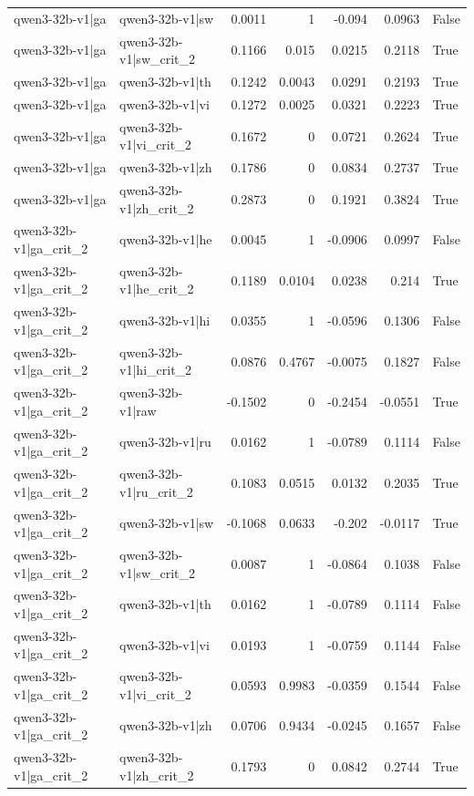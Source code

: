 \begin{table}
\begin{tabular}{l l r r r r l}
qwen3-32b-v1|ga & qwen3-32b-v1|sw & 0.0011 & 1 & -0.094 & 0.0963 & False \\
qwen3-32b-v1|ga & qwen3-32b-v1|sw_crit_2 & 0.1166 & 0.015 & 0.0215 & 0.2118 & True \\
qwen3-32b-v1|ga & qwen3-32b-v1|th & 0.1242 & 0.0043 & 0.0291 & 0.2193 & True \\
qwen3-32b-v1|ga & qwen3-32b-v1|vi & 0.1272 & 0.0025 & 0.0321 & 0.2223 & True \\
qwen3-32b-v1|ga & qwen3-32b-v1|vi_crit_2 & 0.1672 & 0 & 0.0721 & 0.2624 & True \\
qwen3-32b-v1|ga & qwen3-32b-v1|zh & 0.1786 & 0 & 0.0834 & 0.2737 & True \\
qwen3-32b-v1|ga & qwen3-32b-v1|zh_crit_2 & 0.2873 & 0 & 0.1921 & 0.3824 & True \\
qwen3-32b-v1|ga_crit_2 & qwen3-32b-v1|he & 0.0045 & 1 & -0.0906 & 0.0997 & False \\
qwen3-32b-v1|ga_crit_2 & qwen3-32b-v1|he_crit_2 & 0.1189 & 0.0104 & 0.0238 & 0.214 & True \\
qwen3-32b-v1|ga_crit_2 & qwen3-32b-v1|hi & 0.0355 & 1 & -0.0596 & 0.1306 & False \\
qwen3-32b-v1|ga_crit_2 & qwen3-32b-v1|hi_crit_2 & 0.0876 & 0.4767 & -0.0075 & 0.1827 & False \\
qwen3-32b-v1|ga_crit_2 & qwen3-32b-v1|raw & -0.1502 & 0 & -0.2454 & -0.0551 & True \\
qwen3-32b-v1|ga_crit_2 & qwen3-32b-v1|ru & 0.0162 & 1 & -0.0789 & 0.1114 & False \\
qwen3-32b-v1|ga_crit_2 & qwen3-32b-v1|ru_crit_2 & 0.1083 & 0.0515 & 0.0132 & 0.2035 & True \\
qwen3-32b-v1|ga_crit_2 & qwen3-32b-v1|sw & -0.1068 & 0.0633 & -0.202 & -0.0117 & True \\
qwen3-32b-v1|ga_crit_2 & qwen3-32b-v1|sw_crit_2 & 0.0087 & 1 & -0.0864 & 0.1038 & False \\
qwen3-32b-v1|ga_crit_2 & qwen3-32b-v1|th & 0.0162 & 1 & -0.0789 & 0.1114 & False \\
qwen3-32b-v1|ga_crit_2 & qwen3-32b-v1|vi & 0.0193 & 1 & -0.0759 & 0.1144 & False \\
qwen3-32b-v1|ga_crit_2 & qwen3-32b-v1|vi_crit_2 & 0.0593 & 0.9983 & -0.0359 & 0.1544 & False \\
qwen3-32b-v1|ga_crit_2 & qwen3-32b-v1|zh & 0.0706 & 0.9434 & -0.0245 & 0.1657 & False \\
qwen3-32b-v1|ga_crit_2 & qwen3-32b-v1|zh_crit_2 & 0.1793 & 0 & 0.0842 & 0.2744 & True \\

\end{tabular}
\end{table}
